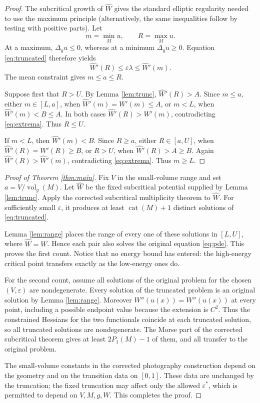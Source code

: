 \documentclass[11pt]{article}
\newcommand{\vol}{\operatorname{vol}}
\newcommand{\cat}{\operatorname{cat}}
\begin{document}
\begin{proof}
The subcritical growth of $\widehat W$ gives the standard elliptic regularity
needed to use the maximum principle (alternatively, the same inequalities
follow by testing with positive parts).  Let
\[
 m=\min_Mu,\qquad R=\max_Mu.
\]
At a maximum, $\Delta_g u\le0$, whereas at a minimum
$\Delta_g u\ge0$.  Equation \eqref{eq:truncated} therefore yields
\begin{equation}\label{eq:extrema}
 \widehat W'(R)\le\varepsilon\lambda\le\widehat W'(m).
\end{equation}
The mean constraint gives $m\le a\le R$.

Suppose first that $R>U$.  By Lemma \ref{lem:trunc},
$\widehat W'(R)>A$.  Since $m\le a$, either $m\in[L,a]$, when
$\widehat W'(m)=W'(m)\le A$, or $m<L$, when
$\widehat W'(m)<B\le A$.  In both cases
$\widehat W'(R)>\widehat W'(m)$, contradicting \eqref{eq:extrema}.
Thus $R\le U$.

If $m<L$, then $\widehat W'(m)<B$.  Since $R\ge a$, either
$R\in[a,U]$, when $\widehat W'(R)=W'(R)\ge B$, or $R>U$, when
$\widehat W'(R)>A\ge B$.  Again
$\widehat W'(R)>\widehat W'(m)$, contradicting \eqref{eq:extrema}.
Thus $m\ge L$.
\end{proof}

\begin{proof}[Proof of Theorem \ref{thm:main}]
Fix $V$ in the small-volume range and set $a=V/\vol_g(M)$.  Let
$\widehat W$ be the fixed subcritical potential supplied by Lemma
\ref{lem:trunc}.  Apply the corrected subcritical multiplicity theorem
\cite[Theorem 2.1]{corrigendum} to $\widehat W$.  For sufficiently small
$\varepsilon$, it produces at least $\cat(M)+1$ distinct solutions of
\eqref{eq:truncated}.

Lemma \ref{lem:range} places the range of every one of these solutions in
$[L,U]$, where $\widehat W=W$.  Hence each pair also solves the original
equation \eqref{eq:pde}.  This proves the first count.  Notice that no energy
bound has entered: the high-energy critical point transfers exactly as the
low-energy ones do.

For the second count, assume all solutions of the original problem for the
chosen $(V,\varepsilon)$ are nondegenerate.  Every solution of the truncated
problem is an original solution by Lemma \ref{lem:range}.  Moreover
$\widehat W''(u(x))=W''(u(x))$ at every point, including a possible endpoint
value because the extension is $C^2$.  Thus the constrained Hessians for the
two functionals coincide at each truncated solution, so all truncated
solutions are nondegenerate.  The Morse part of the corrected subcritical
theorem gives at least $2P_1(M)-1$ of them, and all transfer to the original
problem.

The small-volume constants in the corrected photography construction depend
on the geometry and on the transition data on $[0,1]$.  These data are
unchanged by the truncation; the fixed truncation may affect only the allowed
$\varepsilon^*$, which is permitted to depend on $V,M,g,W$.  This completes
the proof.
\end{proof}
\end{document}
